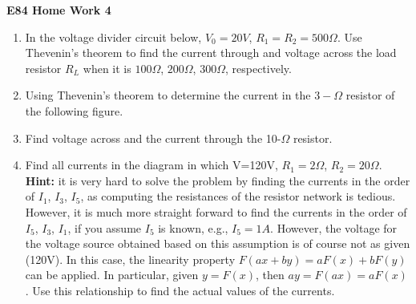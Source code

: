 \usepackage{html}

\begin{center}
{\Large \bf E84 Home Work 4}
\end{center}
\begin{enumerate}

\begin{enumerate}

\item In the voltage divider circuit below, $V_0=20V$, $R_1=R_2=500\Omega$. 
Use Thevenin's theorem to find the current through and voltage across the 
load resistor $R_L$ when it is $100\Omega$, $200\Omega$, $300\Omega$, 
respectively.



\item Using Thevenin's theorem to determine the current in the $3-\Omega$ 
resistor of the following figure.



\item Find voltage across and the current through the 10-$\Omega$ resistor.




\item 

Find all currents in the diagram in which V=120V, $R_1=2\Omega$, $R_2=20\Omega$. 
{\bf Hint:} it is very hard to solve the problem by finding the currents in the
order of $I_1$, $I_3$, $I_5$, as computing the resistances of the resistor 
network is tedious. However, it is much more straight forward to find the 
currents in the order of $I_5$, $I_3$, $I_1$, if you assume $I_5$ is known, e.g.,
$I_5=1A$. However, the voltage for the voltage source obtained based on this 
assumption is of course not as given (120V). In this case, the linearity property
$F(ax+by)=aF(x)+bF(y)$ can be applied. In particular, given $y=F(x)$, then 
$ay=F(ax)=aF(x)$. Use this relationship to find the actual values of the 
currents.


\end{enumerate}
\end{enumerate}
